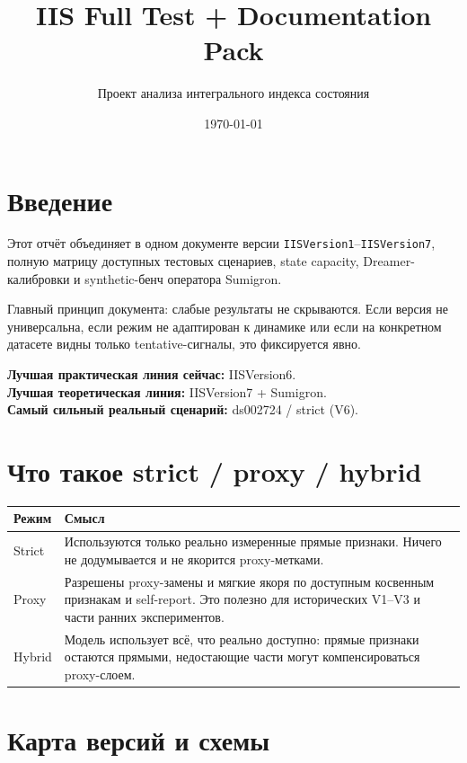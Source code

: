 \documentclass[11pt,a4paper]{article}
\title{IIS Full Test + Documentation Pack}
\author{Проект анализа интегрального индекса состояния}
\date{\today}
\begin{document}
\maketitle

\section{Введение}
Этот отчёт объединяет в одном документе версии \texttt{IISVersion1}--\texttt{IISVersion7}, полную матрицу доступных тестовых сценариев, state capacity, Dreamer-калибровки и synthetic-бенч оператора Sumigron.

Главный принцип документа: слабые результаты не скрываются. Если версия не универсальна, если режим не адаптирован к динамике или если на конкретном датасете видны только tentative-сигналы, это фиксируется явно.

\textbf{Лучшая практическая линия сейчас:} IISVersion6.\\
\textbf{Лучшая теоретическая линия:} IISVersion7 + Sumigron.\\
\textbf{Самый сильный реальный сценарий:} ds002724 / strict (V6).

\section{Что такое strict / proxy / hybrid}
\begin{center}
\begin{tabular}{p{2.2cm}p{11.8cm}}
\toprule
Режим & Смысл \\
\midrule
Strict & Используются только реально измеренные прямые признаки. Ничего не додумывается и не якорится proxy-метками. \\
Proxy & Разрешены proxy-замены и мягкие якоря по доступным косвенным признакам и self-report. Это полезно для исторических V1–V3 и части ранних экспериментов. \\
Hybrid & Модель использует всё, что реально доступно: прямые признаки остаются прямыми, недостающие части могут компенсироваться proxy-слоем. \\
\bottomrule
\end{tabular}
\end{center}

\section{Карта версий и схемы}
\end{document}
